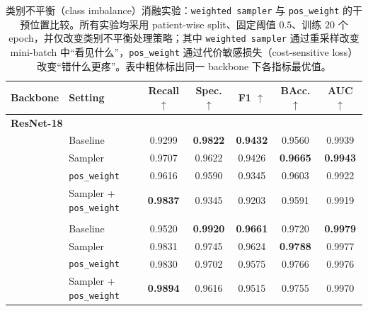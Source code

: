 \begin{table}[t]
    \centering
    \small
    \setlength{\tabcolsep}{4pt}
    \caption{类别不平衡（class imbalance）消融实验：\texttt{weighted sampler} 与 \texttt{pos\_weight} 的干预位置比较。所有实验均采用 patient-wise split、固定阈值 $0.5$、训练 $20$ 个 epoch，并仅改变类别不平衡处理策略；其中 \texttt{weighted sampler} 通过重采样改变 mini-batch 中“看见什么”，\texttt{pos\_weight} 通过代价敏感损失（cost-sensitive loss）改变“错什么更疼”。表中粗体标出同一 backbone 下各指标最优值。}
    \label{tab:imbalance_ablation_comparison}
    \begin{tabularx}{\textwidth}{@{}l>{\raggedright\arraybackslash}Xccccc@{}}
        \toprule
        Backbone & Setting & Recall $\uparrow$ & Spec. $\uparrow$ & F1 $\uparrow$ & BAcc. $\uparrow$ & AUC $\uparrow$ \\
        \midrule
        \multicolumn{7}{l}{\textbf{ResNet-18}} \\
        & Baseline & 0.9299 & \textbf{0.9822} & \textbf{0.9432} & 0.9560 & 0.9939 \\
        & Sampler & 0.9707 & 0.9622 & 0.9426 & \textbf{0.9665} & \textbf{0.9943} \\
        & \texttt{pos\_weight} & 0.9616 & 0.9590 & 0.9345 & 0.9603 & 0.9922 \\
        & Sampler + \texttt{pos\_weight} & \textbf{0.9837} & 0.9345 & 0.9203 & 0.9591 & 0.9919 \\
        \addlinespace[0.35em]
        \multicolumn{7}{l}{\textbf{ResNet-50}} \\
        & Baseline & 0.9520 & \textbf{0.9920} & \textbf{0.9661} & 0.9720 & \textbf{0.9979} \\
        & Sampler & 0.9831 & 0.9745 & 0.9624 & \textbf{0.9788} & 0.9977 \\
        & \texttt{pos\_weight} & 0.9830 & 0.9702 & 0.9575 & 0.9766 & 0.9976 \\
        & Sampler + \texttt{pos\_weight} & \textbf{0.9894} & 0.9616 & 0.9515 & 0.9755 & 0.9970 \\
        \bottomrule
    \end{tabularx}
\end{table}
